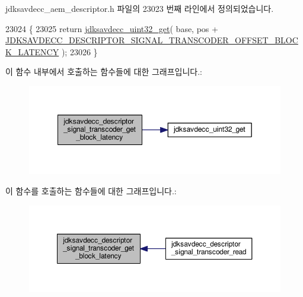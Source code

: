 jdksavdecc\+\_\+aem\+\_\+descriptor.\+h 파일의 23023 번째 라인에서 정의되었습니다.


\begin{DoxyCode}
23024 \{
23025     \textcolor{keywordflow}{return} \hyperlink{group__endian_gaefcf5bd4f368997a82f358ab89052d6b}{jdksavdecc\_uint32\_get}( base, pos + 
      \hyperlink{group__descriptor__transcoder_ga01d462c88ea98189f0b7ff5635f2e795}{JDKSAVDECC\_DESCRIPTOR\_SIGNAL\_TRANSCODER\_OFFSET\_BLOCK\_LATENCY}
       );
23026 \}
\end{DoxyCode}


이 함수 내부에서 호출하는 함수들에 대한 그래프입니다.\+:
\nopagebreak
\begin{figure}[H]
\begin{center}
\leavevmode
\includegraphics[width=349pt]{group__descriptor__transcoder_ga747b2b28da46e2c0f3bf92f45ff433cf_cgraph}
\end{center}
\end{figure}




이 함수를 호출하는 함수들에 대한 그래프입니다.\+:
\nopagebreak
\begin{figure}[H]
\begin{center}
\leavevmode
\includegraphics[width=350pt]{group__descriptor__transcoder_ga747b2b28da46e2c0f3bf92f45ff433cf_icgraph}
\end{center}
\end{figure}


